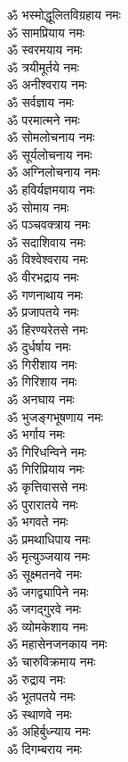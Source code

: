 \begin{multicols}{2}
\begin{flushleft}
ॐ भस्मोद्धूलितविग्रहाय नमः\\
ॐ सामप्रियाय नमः\\
ॐ स्वरमयाय नमः\\
ॐ त्रयीमूर्तये नमः\\
ॐ अनीश्वराय नमः\\
ॐ सर्वज्ञाय नमः\\
ॐ परमात्मने नमः\\
ॐ सोमलोचनाय नमः\\
ॐ सूर्यलोचनाय नमः\\
ॐ अग्निलोचनाय नमः\hfill{}\\
ॐ हविर्यज्ञमयाय नमः\\
ॐ सोमाय नमः\\
ॐ पञ्चवक्त्राय नमः\\
ॐ सदाशिवाय नमः\\
ॐ विश्वेश्वराय नमः\\
ॐ वीरभद्राय नमः\\
ॐ गणनाथाय नमः\\
ॐ प्रजापतये नमः\\
ॐ हिरण्यरेतसे नमः\\
ॐ दुर्धर्षाय नमः\hfill{}\\
ॐ गिरीशाय नमः\\
ॐ गिरिशाय नमः\\
ॐ अनघाय नमः\\
ॐ भुजङ्गभूषणाय नमः\\
ॐ भर्गाय नमः\\
ॐ गिरिधन्विने नमः\\
ॐ गिरिप्रियाय नमः\\
ॐ कृत्तिवाससे नमः\\
ॐ पुरारातये नमः\\
ॐ भगवते नमः\hfill{}\\
ॐ प्रमथाधिपाय नमः\\
ॐ मृत्युञ्जयाय नमः\\
ॐ सूक्ष्मतनवे नमः\\
ॐ जगद्व्यापिने नमः\\
ॐ जगद्गुरवे नमः\\
ॐ व्योमकेशाय नमः\\
ॐ महासेनजनकाय नमः\\
ॐ चारुविक्रमाय नमः\\
ॐ रुद्राय नमः\\
ॐ भूतपतये नमः\hfill{}\\
ॐ स्थाणवे नमः\\
ॐ अहिर्बुध्न्याय नमः\\
ॐ दिगम्बराय नमः\\

\end{flushleft}
\end{multicols}
